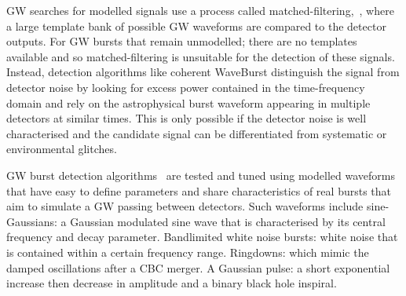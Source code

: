 \documentclass[12pt]{iopart}
\newcommand{\chris}[1]{\textbf{\textcolor{green}{CHRIS: #1}}}
\begin{document}
%
GW searches for modelled signals use a process called
matched-filtering,~\cite{Owen1998,Usman_2016,sachdev2019gstlal}, where a large template bank of possible
GW waveforms are compared to the detector outputs. For GW bursts that remain unmodelled; there are no
templates available and so matched-filtering is unsuitable for the detection of
these signals.  Instead, detection algorithms like coherent WaveBurst \cite{drago2020coherent} distinguish the signal from
detector noise by looking for excess power contained in the time-frequency
domain and rely on the
astrophysical burst waveform appearing in multiple detectors at similar times.
This is only possible if the detector noise is well characterised and the
candidate signal can be differentiated from systematic or environmental
glitches. 

%
GW burst detection algorithms~\cite{drago2020coherent,Klimenko_2008, Aso_2008} are tested
and tuned using modelled waveforms that have easy to define parameters and share characteristics of real bursts that aim to simulate a GW passing between
detectors. Such waveforms include sine-Gaussians: a
Gaussian modulated sine wave that is characterised by its central frequency and
decay parameter. Bandlimited white noise bursts: white noise that is contained
within a certain frequency range. Ringdowns: which mimic the damped
oscillations after a \ac{CBC} merger. A Gaussian pulse: a short exponential increase then decrease in amplitude and a binary black hole inspiral.
%

\end{document}
